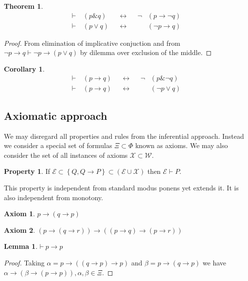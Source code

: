 \documentclass{amsbook}
\newcommand{\setsm}[1]{\left\{#1\right\}}
\newcommand{\wffs}{\mathcal W}
\newcommand{\infers}{\mathrel\vdash}
\newcommand{\theorem}{\mathord\vdash\medspace}
\newcommand{\then}{\mathrel\rightarrow}
\newcommand{\conj}{\mathrel\&}
\newcommand{\eqv}{\mathrel\leftrightarrow}
\newcommand{\disj}{\mathrel\vee}
\theoremstyle{definition}
\newtheorem{axm}{Axiom}[chapter]
\newtheorem{prop}{Property}[section]
\newtheorem{thm}{Theorem}[section]
\newtheorem{lmm}{Lemma}[section]
\newtheorem{crl}{Corollary}[section]
\begin{document}
\begin{thm}
    \begin{align*}
         & \theorem & (p \conj q) &  & \eqv &  & \neg & (p \then \neg q) & \\
         & \theorem & (p \disj q) &  & \eqv &  &      & (\neg p \then q) &
    \end{align*}
    \begin{proof}
        From elimination of implicative conjuction and from $\neg p \then q \infers \neg p \then (p \disj q)$ by dilemma over exclusion of the middle.
    \end{proof}
\end{thm}

\begin{crl}
    \begin{align*}
         & \theorem & (p \then q) &  & \eqv &  & \neg & (p \conj \neg q) & \\
         & \theorem & (p \then q) &  & \eqv &  &      & (\neg p \disj q) &
    \end{align*}
\end{crl}

\subsection{Axiomatic approach}

We may disregard all properties and rules from the inferential approach. Instead we consider a special set of formulas $\Xi \subset \Phi$ known as axioms. We may also consider the set of all instances of axioms $\mathcal X \subset \wffs$.

\begin{prop}
    If $\mathcal E \subset \setsm {Q, Q \then P} \subset (\mathcal E \cup \mathcal X)$ then $\mathcal E \infers P$.
\end{prop}

This property is independent from standard modus ponens yet extends it. It is also independent from monotony.

\begin{axm}
    $p \then (q \then p)$
\end{axm}

\begin{axm}
    $(p \then (q \then r)) \then ((p \then q) \then (p \then r))$
\end{axm}

\begin{lmm}
    $\theorem p \then p$
    \begin{proof}
        Taking $\alpha = p \then ((q \then p) \then p)$ and $\beta = p \then (q \then p)$ we have $\alpha \then (\beta \then (p \then p)), \alpha, \beta \in \Xi$.
    \end{proof}
\end{lmm}
\end{document}
